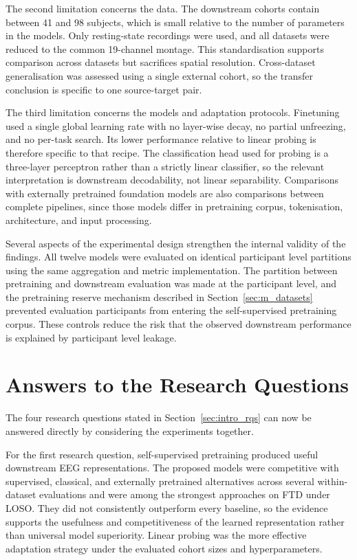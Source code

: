 The second limitation concerns the data. The downstream cohorts contain between 41 and 98 subjects, which is small relative to the number of parameters in the models. Only resting-state recordings were used, and all datasets were reduced to the common 19-channel montage. This standardisation supports comparison across datasets but sacrifices spatial resolution. Cross-dataset generalisation was assessed using a single external cohort, so the transfer conclusion is specific to one source-target pair.

The third limitation concerns the models and adaptation protocols. Finetuning used a single global learning rate with no layer-wise decay, no partial unfreezing, and no per-task search. Its lower performance relative to linear probing is therefore specific to that recipe. The classification head used for probing is a three-layer perceptron rather than a strictly linear classifier, so the relevant interpretation is downstream decodability, not linear separability. Comparisons with externally pretrained foundation models are also comparisons between complete pipelines, since those models differ in pretraining corpus, tokenisation, architecture, and input processing.

Several aspects of the experimental design strengthen the internal validity of the findings. All twelve models were evaluated on identical participant level partitions using the same aggregation and metric implementation. The partition between pretraining and downstream evaluation was made at the participant level, and the pretraining reserve mechanism described in Section~\ref{sec:m_datasets} prevented evaluation participants from entering the self-supervised pretraining corpus. These controls reduce the risk that the observed downstream performance is explained by participant level leakage.

\section{Answers to the Research Questions}\label{sec:d_rqs}

The four research questions stated in Section~\ref{sec:intro_rqs} can now be answered directly by considering the experiments together.

For the first research question, self-supervised pretraining produced useful downstream EEG representations. The proposed models were competitive with supervised, classical, and externally pretrained alternatives across several within-dataset evaluations and were among the strongest approaches on FTD under LOSO. They did not consistently outperform every baseline, so the evidence supports the usefulness and competitiveness of the learned representation rather than universal model superiority. Linear probing was the more effective adaptation strategy under the evaluated cohort sizes and hyperparameters.

